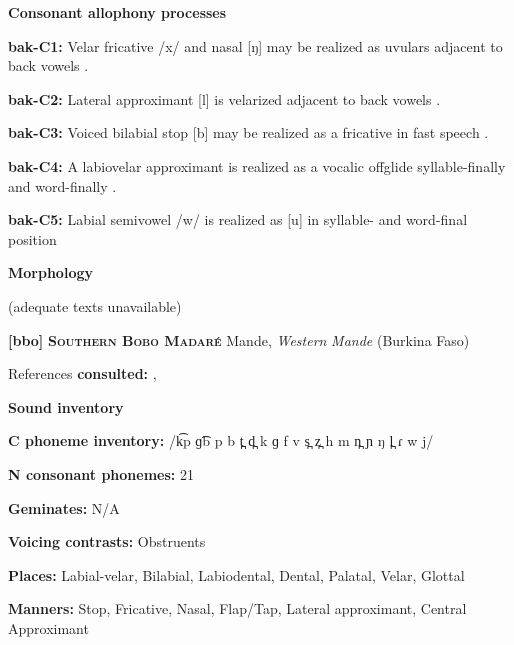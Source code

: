 \textbf{Consonant allophony processes}



\textbf{bak-C1:} Velar fricative /x/ and nasal [ŋ] may be realized as uvulars adjacent to back vowels \citep[11]{Poppe1964}.



\textbf{bak-C2:} Lateral approximant [l] is velarized adjacent to back vowels \citep[10]{Poppe1964}.



\textbf{bak-C3:} Voiced bilabial stop [b] may be realized as a fricative in fast speech \citep[8]{Poppe1964}.



\textbf{bak-C4:}  A labiovelar approximant is realized as a vocalic offglide syllable-finally and word-finally \citep[9]{Poppe1964}.



\textbf{bak-C5:} Labial semivowel /w/ is realized as [u] in syllable- and word-final position \citep[9]{Poppe1964}



\textbf{Morphology}



(adequate texts unavailable)



\textbf{[bbo]}   \textbf{\textsc{Southern Bobo Madaré}}  Mande, \textit{Western} \textit{Mande} (Burkina Faso)



References \textbf{consulted:} \citet{Morse1976}, \citet{Sanou1978}



\textbf{Sound inventory}



\textbf{C phoneme inventory:} /k͡p ɡ͡b p b t̪ d̪ k ɡ f v s̪ z̪ h m n̪ ɲ ŋ l̪ ɾ w j/



\textbf{N consonant phonemes:} 21



\textbf{Geminates:} N/A



\textbf{Voicing contrasts:} Obstruents



\textbf{Places:} Labial-velar, Bilabial, Labiodental, Dental, Palatal, Velar, Glottal



\textbf{Manners:} Stop, Fricative, Nasal, Flap/Tap, Lateral approximant, Central Approximant




